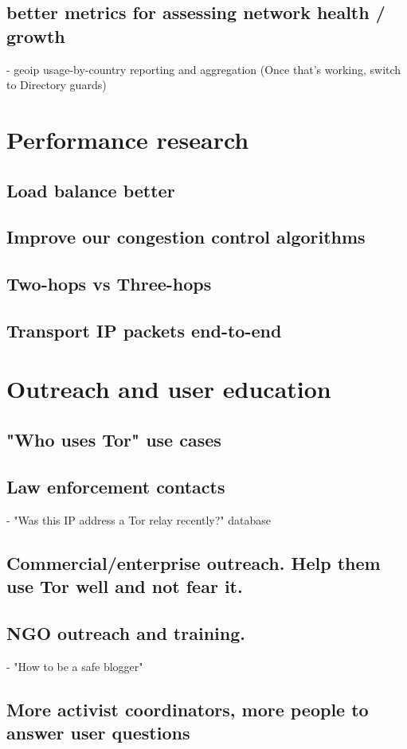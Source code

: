 \documentclass{article}
\begin{document}
\subsection{better metrics for assessing network health / growth}
      - geoip usage-by-country reporting and aggregation
        (Once that's working, switch to Directory guards)
\section{Performance research}
\subsection{Load balance better}
\subsection{Improve our congestion control algorithms}
\subsection{Two-hops vs Three-hops}
\subsection{Transport IP packets end-to-end}
\section{Outreach and user education}
\subsection{"Who uses Tor" use cases}
\subsection{Law enforcement contacts}
      - "Was this IP address a Tor relay recently?" database
\subsection{Commercial/enterprise outreach. Help them use Tor well and
      not fear it.}
\subsection{NGO outreach and training.}
      - "How to be a safe blogger"
\subsection{More activist coordinators, more people to answer user questions}
\end{document}

